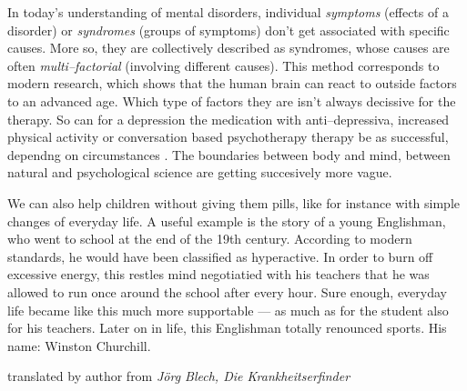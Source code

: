 \documentclass[../main.tex]{subfiles}
\begin{document}
\vspace{5mm}

In today's understanding of mental disorders, individual \emph{symptoms} (effects of a disorder)
or \emph{syndromes} (groups of symptoms) don't get associated with specific causes.
More so, they are collectively described as syndromes, whose causes are often \emph{multi--factorial} (involving different causes).
This method corresponds to modern research, which shows that the human brain can react to outside factors to an advanced age.
Which type of factors they are isn't always decissive for the therapy.
So can for a depression the medication with anti--depressiva,
increased physical activity or conversation based psychotherapy therapy be as successful, dependng on circumstances .
The boundaries between body and mind, between natural  and psychological science are getting succesively more vague.

\setlength{\epigraphwidth}{0.8\textwidth}
\epigraph{We can also help children without giving them pills, like for instance with simple changes of everyday life.
  A useful example is the story of a young Englishman, who went to school at the end of the 19th century.
  According to modern standards, he would have been classified as hyperactive.
  In order to burn off excessive energy, this restles mind negotiatied with his teachers that he was allowed to run once around the
  school after every hour.
  Sure enough, everyday life became like this much more supportable --- as much as for the student also for his teachers.
  Later on in life, this Englishman totally renounced sports.
  His name: Winston Churchill.
}{translated by author from \textit{J\"org Blech, Die Krankheitserfinder}}
\setlength{\epigraphwidth}{0.4\textwidth}
\end{document}
